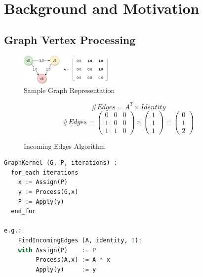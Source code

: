\section{Background and Motivation}

\subsection{Graph Vertex Processing}

\begin{figure}[htbp]
\centering
\includegraphics[width=0.4\textwidth]{figures/sample_graph}
\caption{Sample Graph Representation}
\label{fig:sample_graph}
\end{figure}

\begin{figure}[ htbp ] 
\begin{equation}
\#Edges = A^{T} \times Identity
\end{equation}
\begin{equation}
\#Edges = 
\left(\begin{array}{ccc} 0 & 0 & 0 \\ 1 & 0 & 0 \\ 1 & 1 & 0 \end{array}\right) \times
\left(\begin{array}{c} 1 \\ 1 \\ 1 \end{array}\right) 
= \left(\begin{array}{c} 0 \\ 1 \\ 2 \end{array}\right) 
\end{equation}
\caption{Incoming Edges Algorithm}
\label{fig:sample_algorithm}
\end{figure} 

\begin{lstlisting}[emph={Assign, Process, Apply}, emphstyle=\color{blue}, numbers=none, escapechar=\%, language=Python, caption=Graph Processing Kernel]
GraphKernel (G, P, iterations) :
  for_each iterations
    x := Assign(P)
  	y := Process(G,x)
  	P := Apply(y)	  
  end_for
  
e.g.: 
	FindIncomingEdges (A, identity, 1):
	with Assign(P)    := P
	     Process(A,x) := A * x
	     Apply(y)     := y
\end{lstlisting}

